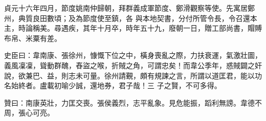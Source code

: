 \begin{pinyinscope}
 貞元十六年四月，節度姚南仲歸朝，拜群義成軍節度、鄭滑觀察等使。先寓居鄭州，典質良田數頃；及為節度使至鎮，各
 與本地契書，分付所管令長，令召還本主，時論稱美。尋遇疾，其年十月卒，時年五十九，廢朝一日，贈工部尚書，賵賻布帛、米粟有差。



 史臣曰：韋南康、張徐州，慷慨下位之中，橫身喪亂之際，力扶衰運，氣激壯圖，義風凜凜，聳動群醜，舂盜之喉，折賊之角，可謂忠矣！而韋公季年，惑賊闢之奸說，欲兼巴、益，則志未可量。徐州請覲，頗有規諫之言，所謂以道匡君，能以功名始終者。盧載初喻少誠，還地券，君子哉！三
 子之賢，不可多得。



 贊曰：南康英壯，力匡交喪。張侯義烈，志平亂象。見危能振，蹈利無謗。韋德不周，張心可亮。



\end{pinyinscope}